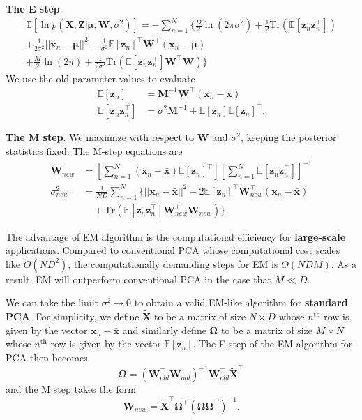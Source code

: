 \documentclass[a4paper]{book}
\newcommand{\up}{\mathrm}
\renewcommand{\bf}{\mathbf}
\newcommand{\bb}{\mathbb}
\newcommand{\bs}{\boldsymbol}
\begin{document}
\textbf{The E step}. \begin{align}
\bb{E}[\ln p(\bf{X,Z}|\bs{\mu},\bf{W},\sigma^2)] = -\sum_{n=1}^N \{ \frac{D}{2}\ln (2\pi\sigma^2)+\frac{1}{2}\up{Tr}(\bb{E}[\bf{z}_n\bf{z}_n^{\intercal}])\\ +\frac{1}{2\sigma^2}||\bf{x}_n-\bs{\mu}||^2-\frac{1}{\sigma^2}\bb{E}[\bf{z}_n]^{\intercal} \bf{W}^{\intercal}(\bf{x}_n-\bs{\mu})\\+\frac{M}{2}\ln (2\pi)+\frac{1}{2\sigma^2}\up{Tr}(\bb{E}[\bf{z}_n\bf{z}_n^{\intercal}]\bf{W}^{\intercal}\bf{W}) \}
\end{align}
We use the old parameter values to evaluate
\begin{align}
	\bb{E}[\bf{z}_n] &= \bf{M}^{-1} \bf{W}^{\intercal} (\bf{x}_n-\bar{\bf{x}}) \label{PCAE1}\\
	\bb{E}[\bf{z}_n\bf{z}_n^{\intercal}] &= \sigma^2 \bf{M}^{-1} + \bb{E}[\bf{z}_n] \bb{E}[\bf{z}_n]^{\intercal}. \label{PCAE2}
\end{align}

\textbf{The M step}. We maximize with respect to $\bf{W}$ and $\sigma^2$, keeping the posterior statistics fixed. The M-step equations are
\begin{align}
	\bf{W}_{new} &= \left[ \sum_{n=1}^N (\bf{x}_n-\bar{\bf{x}})\bb{E}[\bf{z}_n]^{\intercal} \right]\left[
	\sum_{n=1}^N \bb{E}[\bf{z}_n\bf{z}_n^{\intercal}]\right]^{-1} \\
	\sigma_{new}^2 &= \frac{1}{ND} \sum_{n=1}^N \{ ||\bf{x}_n-\bar{\bf{x}}||^2 - 2\bb{E}[\bf{z}_n]^{\intercal} \bf{W}_{new}^{\intercal}(\bf{x}_n-\bar{\bf{x}})\\
	&\quad + \up{Tr}(\bb{E}[\bf{z}_n\bf{z}_n^{\intercal}]\bf{W}_{new}^{\intercal}\bf{W}_{new}) \}.\label{PCAM1}
\end{align}

The advantage of EM algorithm is the computational efficiency for \textbf{large-scale} applications. Compared to conventional PCA whose computational cost scales like $O(ND^2)$, the computationally demanding steps for EM is $O(NDM)$. As a result, EM will outperform conventional PCA in the case that $M\ll D$.

We can take the limit $\sigma^2 \rightarrow 0$ to obtain a valid EM-like algorithm for \textbf{standard PCA}. For simplicity, we define $\tilde{\bf{X}}$ to be a matrix of size $N \times D$ whose $n^{\up{th}}$ row is given by the vector $\bf{x}_n - \bar{\bf{x}}$ and similarly define $\bs{\Omega}$ to be a matrix of size $M \times N$ whose $n^{\up{th}}$ row is given by the vector $\bb{E}[\bf{z}_n]$. The E step of the EM algorithm for PCA then becomes
\begin{equation}
	\bs{\Omega} = (\bf{W}_{old}^{\intercal} \bf{W}_{old})^{-1}\bf{W}_{old}^{\intercal} \tilde{\bf{X}}^{\intercal}
\end{equation}
and the M step takes the form
\begin{equation}
	\bf{W}_{new} = \tilde{\bf{X}}^{\intercal} \bs{\Omega}^{\intercal} (\bs{\Omega}\bs{\Omega}^{\intercal})^{-1}.
\end{equation}
\end{document}
